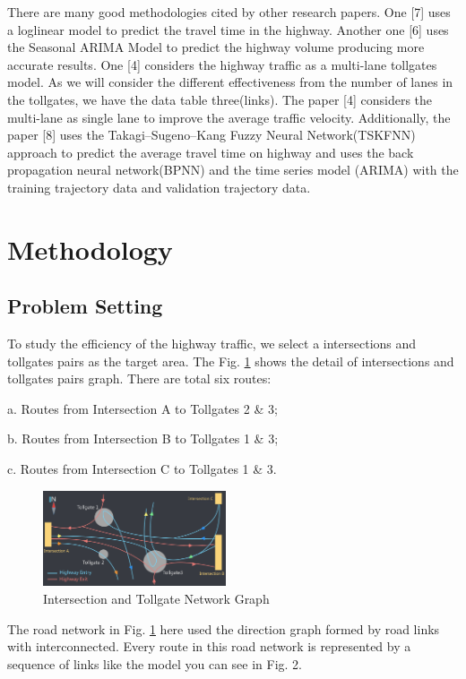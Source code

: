 \documentclass[journal, letterpaper]{IEEEtran}
\begin{document}
There are many good methodologies cited by other research papers. One [7] uses a loglinear model to predict the travel time in the highway. Another one [6] uses the Seasonal ARIMA Model to predict the highway volume producing more accurate results. One [4] considers the highway traffic as a multi-lane tollgates model. As we will consider the different effectiveness from the number of lanes in the tollgates, we have the data table three(links). The paper [4] considers the multi-lane as single lane to improve the average traffic velocity. Additionally, the paper [8] uses the Takagi–Sugeno–Kang Fuzzy Neural Network(TSKFNN) approach to predict the average travel time on highway and uses the back propagation neural network(BPNN) and the time series model (ARIMA) with the training trajectory data and validation trajectory data. 

\section{Methodology}
\large
\subsection{Problem Setting}
To study the efficiency of the highway traffic, we select a intersections and tollgates pairs as the target area. The Fig. \ref{fig:1} shows the detail of intersections and tollgates pairs graph. There are total six routes:

   a. Routes from Intersection A to Tollgates 2 \& 3;
   
   b. Routes from Intersection B to Tollgates 1 \& 3;
   
   c. Routes from Intersection C to Tollgates 1 \& 3.
   
\begin{figure} [H]
  \centering
  \includegraphics[width=0.48\textwidth]{road_graph.png}
  \caption{Intersection and Tollgate Network Graph}
  \label{fig:1}
\end{figure}

The road network in Fig. \ref{fig:1} here used the direction graph formed by road links with interconnected. Every route in this road network is represented by a sequence of links like the model you can see in Fig. 2.
\end{document}
